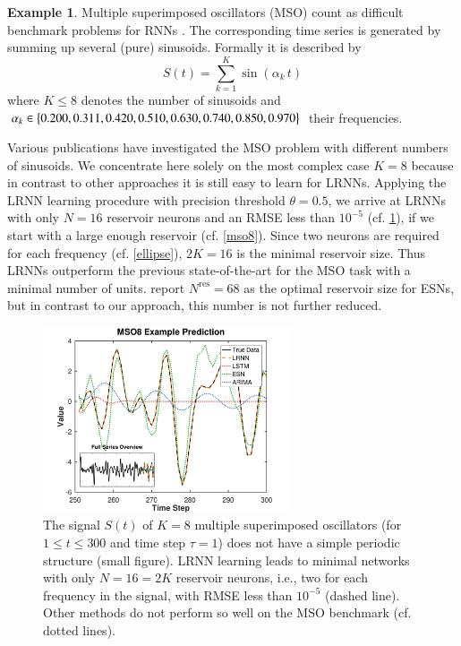 \documentclass[preprint,12pt,times,authoryear]{elsarticle}%
\theoremstyle{definition}
\newtheorem{exmp}{Example}
\begin{document}
\begin{exmp}\label{exmp}
Multiple superimposed oscillators (MSO) count as difficult benchmark problems
for RNNs \citep{KLB12,SW+07}. The corresponding time
series is generated by summing up several (pure) sinusoids. Formally
it is described by
	\[ S(t) = \sum\limits_{k=1}^K \sin(\alpha_k\,t) \]
where $K \le 8$ denotes the number of sinusoids and $\alpha_k \in \big\{ 0.200,
0.311, 0.420, \linebreak 0.510, 0.630, 0.740, 0.850, 0.970 \big\}$ their frequencies.
\end{exmp}

Various publications have investigated the MSO problem with different numbers of
sinusoids. We concentrate here solely on the most complex case $K=8$
because in contrast to other approaches it is still easy to learn for LRNNs.
Applying the LRNN learning procedure with precision threshold $\theta = 0.5$,
we arrive at LRNNs with only $N=16$ reservoir neurons and an RMSE less than
$10^{-5}$ (cf. \cref{signal}), if we start with a large enough reservoir (cf.
\cref{mso8}). Since two neurons are required for each frequency (cf.
\cref{ellipse}), $2K=16$ is the minimal reservoir size. Thus LRNNs outperform
the previous state-of-the-art for the
MSO task with a minimal number of units. \citet{KLB12} report $N^\mathrm{res} =
68$ as the optimal reservoir size for ESNs, but in contrast to our approach,
this number is not further reduced.

\begin{figure}
  \centering
  \includegraphics[width=0.65\textwidth]{fig/mso8_prediction_1}
  \caption{The signal $S(t)$ of $K=8$ multiple superimposed oscillators (for $1
	\le t \le 300$ and time step $\tau=1$) does not have a simple periodic
	structure (small figure). LRNN learning leads to minimal networks with
	only $N=16=2K$ reservoir neurons, i.e., two for each frequency in the
	signal, with RMSE less than $10^{-5}$ (dashed line). Other methods do
	not perform so well on the MSO benchmark (cf. dotted lines).}
  \label{signal}
\end{figure}
\end{document}
